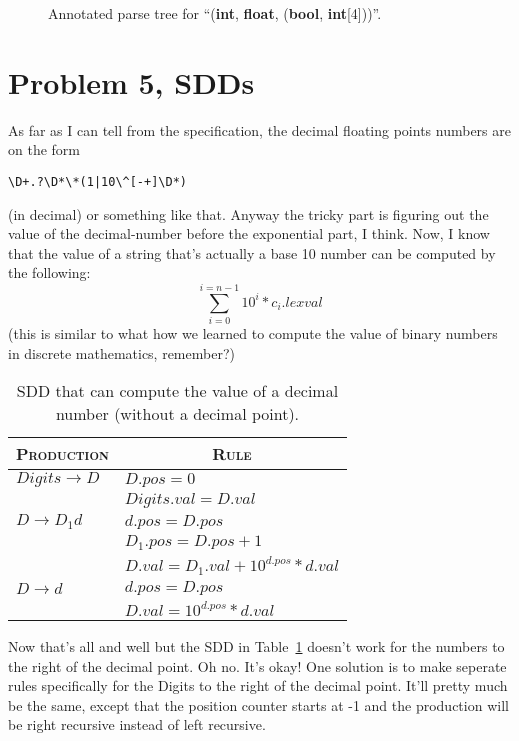 \begin{figure}[H]

\caption{Annotated parse tree for ``(\textbf{int}, \textbf{float}, (\textbf{bool}, \textbf{int}[4]))''.}
\label{fig:4-b-ii}
\end{figure}

\newpage
\section{Problem 5, SDDs}

As far as I can tell from the specification, the decimal floating points numbers are on the form
\begin{verbatim}
\D+.?\D*\*(1|10\^[-+]\D*)
\end{verbatim}
(in decimal) or something like that.
Anyway the tricky part is figuring out the value of the decimal-number before the exponential part, I think.
Now, I know that the value of a string that's actually a base 10 number can be computed by the following:
\[ \sum_{i=0}^{i=n-1} 10^{i}*c_{i}.lexval \]
(this is similar to what how we learned to compute the value of binary numbers in discrete mathematics, remember?)
\begin{table}[H]
	\centering
	\begin{tabular}{l|l}
	\hline	\hline
	\textsc{Production}			& \multicolumn{1}{c}{\textsc{Rule}} \\ \hline
	$Digits\rightarrow D$& $D.pos = 0$ \\ 
						& $Digits.val = D.val$ \\\hline
	$D\rightarrow D_1d$	& $d.pos = D.pos$	\\
						& $D_1.pos = D.pos + 1$ \\
						& $D.val = D_1.val + 10^{d.pos}*d.val$ \\ \hline
	$D\rightarrow d$	& $d.pos = D.pos$	\\
						& $D.val = 10^{d.pos}*d.val$\\

	\hline
	\end{tabular}	
	\caption{SDD that can compute the value of a decimal number (without a decimal point).}
	\label{tab:5-1}
\end{table}

Now that's all and well but the SDD in Table~\ref{tab:5-1} doesn't work for the numbers to the right of the decimal point.
Oh no.
It's okay!
One solution is to make seperate rules specifically for the Digits to the right of the decimal point.
It'll pretty much be the same, except that the position counter starts at -1 and the production will be right recursive instead of left recursive.


